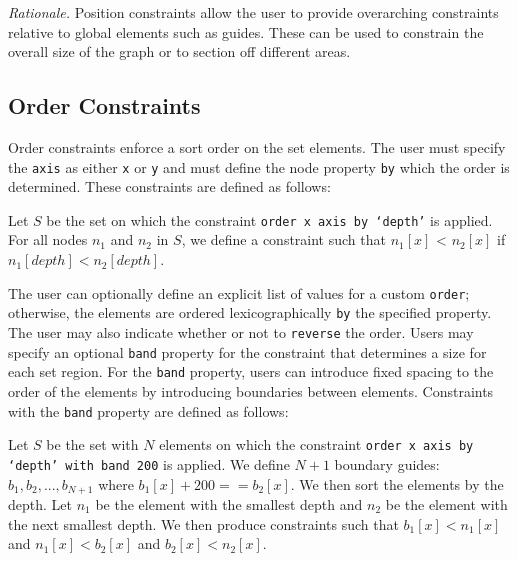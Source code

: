 \emph{Rationale.} Position constraints allow the user to provide
overarching constraints relative to global elements such as guides. These
can be used to constrain the overall size of the graph or to section off
different areas.



\subsection{Order Constraints}

Order constraints enforce a sort order on the set elements. The user must 
specify the \texttt{axis} as either \texttt{x} or \texttt{y} and must define
the node property \texttt{by} which the order is determined. These 
constraints are defined as follows:

\begin{definition}
Let $S$ be the set on which the constraint \texttt{order x axis by `depth'} is applied.
For all nodes $n_1$ and $n_2$ in $S$, we define a constraint such that $n_1[x]$ < $n_2[x]$
if $n_1[depth] < n_2[depth]$.
\end{definition}

The user can optionally define an explicit list of values for a custom
\texttt{order}; otherwise, the elements are ordered lexicographically \texttt{by}
the specified property. The user may also indicate whether
or not to \texttt{reverse} the order. Users may specify an optional
\texttt{band} property for the constraint that determines a size for each
set region. For the \texttt{band} property, users can introduce fixed spacing
to the order of the elements by introducing boundaries between elements.
Constraints with the \texttt{band} property are defined as follows:

\begin{definition}
Let $S$ be the set with $N$ elements on which the constraint 
\texttt{order x axis by `depth' with band 200} is applied.
We define $N+1$ boundary guides: $b_1, b_2, ..., b_{N+1}$ where
$b_1[x] + 200 == b_2[x]$. We then sort the elements by the depth.
Let $n_1$ be the element with the smallest depth and $n_2$ be the element 
with the next smallest depth. We then produce constraints such that
$b_1[x] < n_1[x]$ and $n_1[x] < b_2[x]$ and $b_2[x] < n_2[x]$.
\end{definition}


